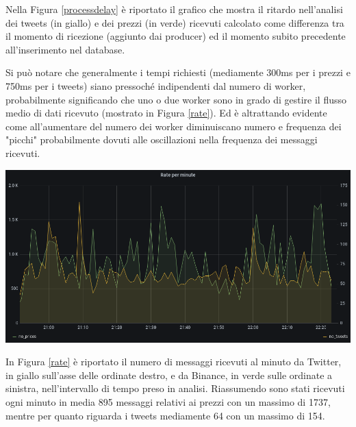 Nella Figura \ref{processdelay} è riportato il grafico che mostra il ritardo nell'analisi dei tweets
(in giallo) e dei prezzi (in verde) ricevuti calcolato come differenza tra il momento di ricezione
(aggiunto dai producer) ed il momento subito precedente all'inserimento nel database.

Si può notare che generalmente i tempi richiesti (mediamente 300ms per i prezzi e 750ms per
i tweets) siano pressoché indipendenti dal numero di worker,
probabilmente significando che uno o due worker sono in grado di gestire il flusso medio di dati
ricevuto (mostrato in Figura \ref{rate}).
Ed è altrattando evidente come all'aumentare del numero dei worker diminuiscano numero e 
frequenza dei "picchi" probabilmente dovuti alle oscillazioni nella frequenza dei messaggi ricevuti.

\begin{center}
    \includegraphics[max width=\linewidth]{rate.png}
    \label{rate}
\end{center}

In Figura \ref{rate} è riportato il numero di messaggi ricevuti al minuto da Twitter, in giallo
sull'asse delle ordinate destro, e da Binance, in verde sulle ordinate a sinistra, nell'intervallo
di tempo preso in analisi.
Riassumendo sono stati ricevuti ogni minuto in media 895 messaggi relativi ai prezzi con un
massimo di 1737, mentre per quanto riguarda i tweets mediamente 64 con un massimo di 154. 

